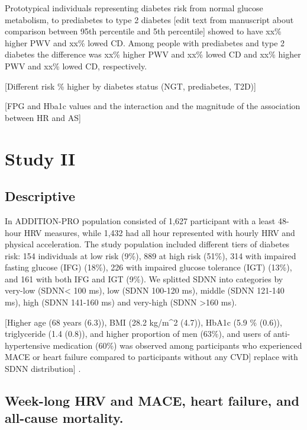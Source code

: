 \documentclass[
  a4paper,
  headsepline=true,
  open=any]{scrbook}
\begin{document}
Prototypical individuals representing diabetes risk from normal glucose
metabolism, to prediabetes to type 2 diabetes {[}edit text from
manuscript about comparison between 95th percentile and 5th
percentile{]} showed to have xx\% higher PWV and xx\% lowed CD. Among
people with prediabetes and type 2 diabetes the difference was xx\%
higher PWV and xx\% lowed CD and xx\% higher PWV and xx\% lowed CD,
respectively.

{[}Different risk \% higher by diabetes status (NGT, prediabetes,
T2D){]}

{[}FPG and Hba1c values and the interaction and the magnitude of the
association between HR and AS{]}

\hypertarget{study-ii}{%
\section{Study II}\label{study-ii}}

\hypertarget{descriptive-1}{%
\subsection{Descriptive}\label{descriptive-1}}

In ADDITION-PRO population consisted of 1,627 participant with a least
48-hour HRV measures, while 1,432 had all hour represented with hourly
HRV and physical acceleration. The study population included different
tiers of diabetes risk: 154 individuals at low risk (9\%), 889 at high
risk (51\%), 314 with impaired fasting glucose (IFG) (18\%), 226 with
impaired glucose tolerance (IGT) (13\%), and 161 with both IFG and IGT
(9\%). We splitted SDNN into categories by very-low (SDNN\textless{} 100
ms), low (SDNN 100-120 ms), middle (SDNN 121-140 ms), high (SDNN 141-160
ms) and very-high (SDNN \textgreater160 ms).

{[}Higher age (68 years (6.3)), BMI (28.2 kg/m\^{}2 (4.7)), HbA1c (5.9
\% (0.6)), triglyceride (1.4 (0.8)), and higher proportion of men
(63\%), and users of anti-hypertensive medication (60\%) was observed
among participants who experienced MACE or heart failure compared to
participants without any CVD{]} replace with SDNN distribution{]} .

\hypertarget{week-long-hrv-and-mace-heart-failure-and-all-cause-mortality.}{%
\subsection{Week-long HRV and MACE, heart failure, and all-cause
mortality.}\label{week-long-hrv-and-mace-heart-failure-and-all-cause-mortality.}}
\end{document}
